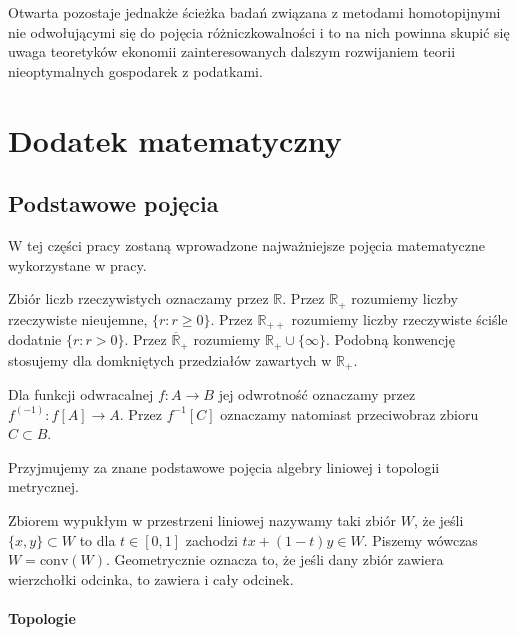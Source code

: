 	Otwarta pozostaje jednakże ścieżka badań związana z metodami homotopijnymi nie odwołującymi się do pojęcia różniczkowalności i to na nich powinna skupić się uwaga teoretyków ekonomii zainteresowanych dalszym rozwijaniem teorii nieoptymalnych gospodarek z podatkami.  
 
 







\chapter{Dodatek matematyczny}\label{chap_appendice}
\section{Podstawowe pojęcia}\label{preliminaries}

W tej części pracy zostaną wprowadzone najważniejsze pojęcia matematyczne wykorzystane w pracy. 

Zbiór liczb rzeczywistych oznaczamy przez $ \mathbb{R} $. Przez $ \mathbb{R}_{+} $ rozumiemy liczby rzeczywiste nieujemne, $\{r :  r \geq 0 \}$. Przez $ \mathbb{R}_{++} $ rozumiemy liczby rzeczywiste ściśle dodatnie $ \{r : r > 0 \} $. Przez $ \overline{\mathbb{R}}_{+} $ rozumiemy $ \mathbb{R}_{+} \cup \{ \infty \} $. Podobną konwencję stosujemy dla domkniętych przedziałów zawartych w $\mathbb{R}_{+}$. 

Dla funkcji odwracalnej $f: A \rightarrow B$ jej odwrotność oznaczamy przez $f^{(-1)}: f[A] \rightarrow A$. Przez $f^{-1}[C]$ oznaczamy natomiast przeciwobraz zbioru $C \subset B$.

Przyjmujemy za znane podstawowe pojęcia algebry liniowej i topologii metrycznej. 

Zbiorem wypukłym w przestrzeni liniowej nazywamy taki zbiór $ W $, że jeśli $ \{x,y\} \subset W$ to dla $ t \in [0,1] $ zachodzi $ tx + (1-t)y \in W $. Piszemy wówczas $ W = \mathrm{conv}(W) $. Geometrycznie oznacza to, że jeśli dany zbiór zawiera wierzchołki odcinka, to zawiera i cały odcinek.

\subsubsection*{Topologie}

